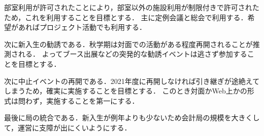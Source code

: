    部室利用が許可されたことにより，部室以外の施設利用が制限付きで許可されたため，これを利用することを目標とする．
    主に定例会議と総会で利用する．希望があればプロジェクト活動でも利用する．
    
    次に新入生の勧誘である．秋学期は対面での活動がある程度再開されることが推測される．
    よってブース出展などの突発的な勧誘イベントは逃さず参加することを目標とする．
    
    次に中止イベントの再開である．2021年度に再開しなければ引き継ぎが途絶えてしまうため，確実に実施することを目標とする．
    このとき対面かWeb上かの形式は問わず，実施することを第一にする．
    
    最後に局の統合である．新入生が例年よりも少ないため会計局の規模を大きくして，運営に支障が出にくいようにする．
    